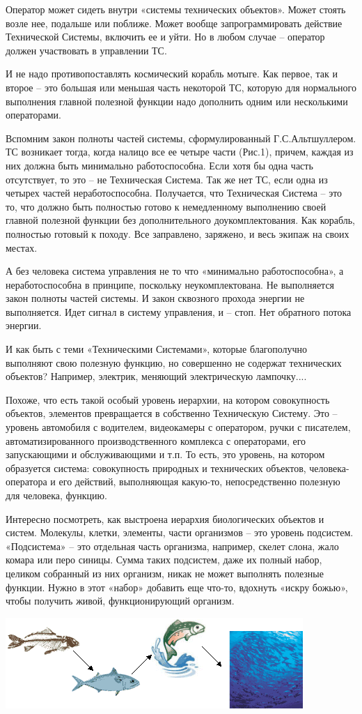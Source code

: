 \documentclass[11pt,a4paper]{article}
\begin{document}
Оператор может сидеть внутри «системы технических объектов». Может стоять
возле нее, подальше или поближе. Может вообще запрограммировать действие
Технической Системы, включить ее и уйти. Но в любом случае – оператор должен
участвовать в управлении ТС.

И не надо противопоставлять космический корабль мотыге. Как первое, так и
второе – это большая или меньшая часть некоторой ТС, которую для нормального
выполнения главной полезной функции надо дополнить одним или несколькими
операторами.

Вспомним закон полноты частей системы, сформулированный Г.С.Альтшуллером. ТС
возникает тогда, когда налицо все ее четыре части (Рис.1), причем, каждая из
них должна быть минимально работоспособна. Если хотя бы одна часть
отсутствует, то это – не Техническая Система. Так же нет ТС, если одна из
четырех частей неработоспособна. Получается, что Техническая Система – это то,
что должно быть полностью готово к немедленному выполнению своей главной
полезной функции без дополнительного доукомплектования. Как корабль, полностью
готовый к походу. Все заправлено, заряжено, и весь экипаж на своих местах.

А без человека система управления не то что «минимально работоспособна», а
неработоспособна в принципе, поскольку неукомплектована. Не выполняется закон
полноты частей системы. И закон сквозного прохода энергии не выполняется. Идет
сигнал в систему управления, и – стоп. Нет обратного потока энергии.

И как быть с теми «Техническими Системами», которые благополучно выполняют
свою полезную функцию, но совершенно не содержат технических объектов?
Например, электрик, меняющий электрическую лампочку....


Похоже, что есть такой особый уровень иерархии, на котором совокупность
объектов, элементов превращается в собственно Техническую Систему. Это –
уровень автомобиля с водителем, видеокамеры с оператором, ручки с писателем,
автоматизированного производственного комплекса с операторами, его
запускающими и обслуживающими и т.п. То есть, это уровень, на котором
образуется система: совокупность природных и технических объектов,
человека-оператора и его действий, выполняющая какую-то, непосредственно
полезную для человека, функцию.


Интересно посмотреть, как выстроена иерархия биологических объектов и
систем. Молекулы, клетки, элементы, части организмов – это уровень
подсистем. «Подсистема» – это отдельная часть организма, например, скелет
слона, жало комара или перо синицы. Сумма таких подсистем, даже их полный
набор, целиком собранный из них организм, никак не может выполнять полезные
функции. Нужно в этот «набор» добавить еще что-то, вдохнуть «искру божью»,
чтобы получить живой, функционирующий организм.
\begin{center}
  \includegraphics[width=.6\textwidth]{mts-2.png}
\end{center}
\end{document}
